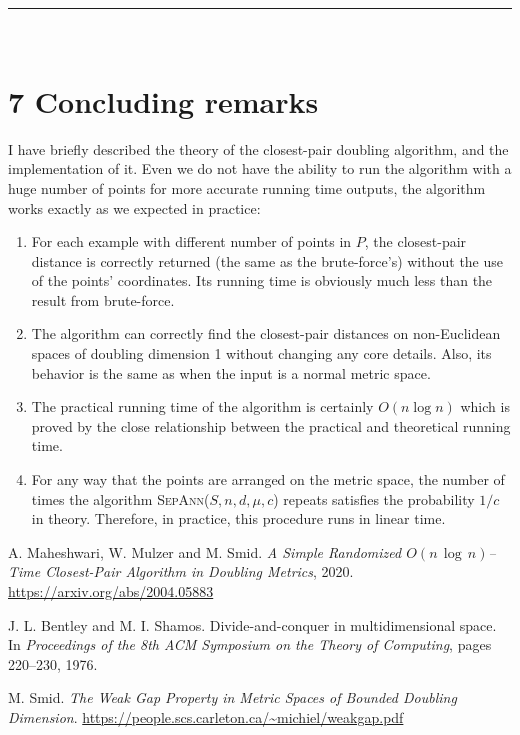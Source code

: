\documentclass[12pt,english,]{article}
\providecommand{\tightlist}{%
  \setlength{\itemsep}{0pt}\setlength{\parskip}{0pt}}
\begin{document}
\hrule

~

\medskip

\hypertarget{section7}{%
\section{\texorpdfstring{7 \enspace Concluding
remarks}{7 Concluding remarks}}\label{section7}}

I have briefly described the theory of the closest-pair doubling
algorithm, and the implementation of it. Even we do not have the ability
to run the algorithm with a huge number of points for more accurate
running time outputs, the algorithm works exactly as we expected in
practice:

\begin{enumerate}
\def\labelenumi{\arabic{enumi}.}
\tightlist
\item
  For each example with different number of points in \(P\), the
  closest-pair distance is correctly returned (the same as the
  brute-force's) without the use of the points' coordinates. Its running
  time is obviously much less than the result from brute-force.
\item
  The algorithm can correctly find the closest-pair distances on
  non-Euclidean spaces of doubling dimension 1 without changing any core
  details. Also, its behavior is the same as when the input is a normal
  metric space.
\item
  The practical running time of the algorithm is certainly
  \(O(n\log n)\) which is proved by the close relationship between the
  practical and theoretical running time.
\item
  For any way that the points are arranged on the metric space, the
  number of times the algorithm \textsc{SepAnn($S,n,d,\mu,c$)} repeats
  satisfies the probability \(1/c\) in theory. Therefore, in practice,
  this procedure runs in linear time.
\end{enumerate}

\newpage

\begin{thebibliography}{9}
A. Maheshwari, W. Mulzer and M. Smid. \emph{A Simple Randomized $O(n\,\log\,n)$–Time Closest-Pair Algorithm in Doubling Metrics}, 2020. \url{https://arxiv.org/abs/2004.05883}

J. L. Bentley and M. I. Shamos. Divide-and-conquer in multidimensional space. In \emph{Proceedings of the 8th ACM Symposium on the Theory of Computing}, pages 220–230,
1976.

M. Smid. \emph{The Weak Gap Property in Metric Spaces of Bounded Doubling Dimension}. \url{https://people.scs.carleton.ca/~michiel/weakgap.pdf}

\end{thebibliography}
\end{document}
